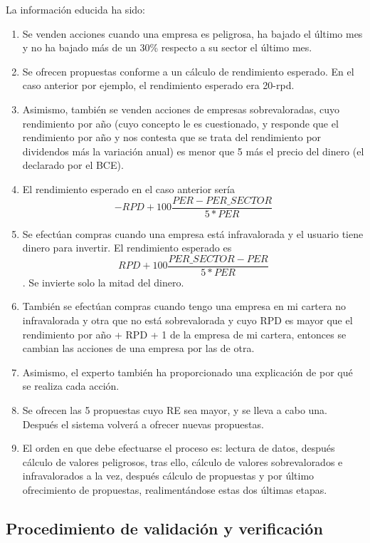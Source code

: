 \documentclass[a4paper,11pt]{article}
\begin{document}
La información educida ha sido:

\begin{enumerate}[$\rightarrow$]
 \item Se venden acciones cuando una empresa es peligrosa, ha bajado el último mes y no ha bajado más de un 30\% respecto 
 a su sector el último mes.
 \item Se ofrecen propuestas conforme a un cálculo de rendimiento esperado. En el caso anterior por ejemplo, el rendimiento
 esperado era 20-rpd.
 \item Asimismo, también se venden acciones de empresas sobrevaloradas, cuyo rendimiento por año (cuyo concepto
 le es cuestionado, y responde que el rendimiento por año y nos contesta que se trata del rendimiento por dividendos más la
 variación anual) es menor que 5 más el precio del dinero (el declarado por el BCE).
 \item El rendimiento esperado en el caso anterior sería $$-RPD + 100 \frac{PER - PER\_SECTOR}{5*PER}$$
 \item Se efectúan compras cuando una empresa está infravalorada y el usuario tiene dinero para invertir. El rendimiento esperado
 es $$RPD + 100 \frac{PER\_SECTOR - PER}{5*PER}$$. Se invierte solo la mitad del dinero.
 \item También se efectúan compras cuando tengo una empresa en mi cartera no infravalorada y otra que no está sobrevalorada
 y cuyo RPD es mayor que el rendimiento por año + RPD + 1 de la empresa de mi cartera, entonces se cambian las acciones de una
 empresa por las de otra.
 \item Asimismo, el experto también ha proporcionado una explicación de por qué se realiza cada acción.
 \item Se ofrecen las 5 propuestas cuyo RE sea mayor, y se lleva a cabo una. Después el sistema volverá a ofrecer nuevas propuestas.
 \item El orden en que debe efectuarse el proceso es: lectura de datos, después cálculo de valores peligrosos, tras ello, cálculo de valores sobrevalorados
 e infravalorados a la vez, después cálculo de propuestas y por último ofrecimiento de propuestas, realimentándose estas dos
 últimas etapas.
\end{enumerate}


\subsection{Procedimiento de validación y verificación}
\end{document}

